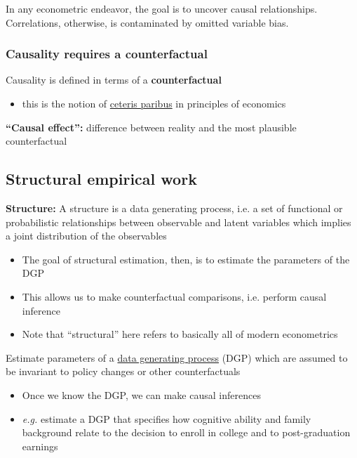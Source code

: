 \documentclass[11pt]{article}
\begin{document}
In any econometric endeavor, the goal is to uncover causal relationships. Correlations, otherwise, is contaminated by omitted variable bias.

\subsubsection{Causality requires a counterfactual}
\label{sec:org87eeace}

Causality is defined in terms of a \textbf{counterfactual}

\begin{itemize}
\item this is the notion of \uline{ceteris paribus} in principles of economics
\end{itemize}

\textbf{``Causal effect'':} difference between reality and the most plausible counterfactual

\subsection{Structural empirical work}
\label{sec:org5281d55}

\textbf{Structure:} A structure is a data generating process, i.e. a set of functional or probabilistic relationships between observable and latent variables which implies a joint distribution of the observables

\begin{itemize}
\item The goal of structural estimation, then, is to estimate the parameters of the DGP
\item This allows us to make counterfactual comparisons, i.e. perform causal inference

\item Note that ``structural'' here refers to basically all of modern econometrics
\end{itemize}

Estimate parameters of a \uline{data generating process} (DGP) which are assumed to be invariant to policy changes or other counterfactuals

\begin{itemize}
\item Once we know the DGP, we can make causal inferences
\item \emph{e.g.} estimate a DGP that specifies how cognitive ability and family background relate to the decision to enroll in college and to post-graduation earnings
\end{itemize}
\end{document}
